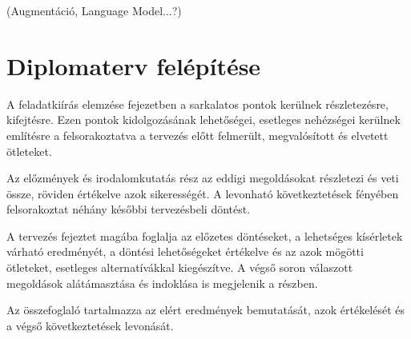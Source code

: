 (Augmentáció, Language Model...?)

\section{Diplomaterv felépítése}

A feladatkiírás elemzése fejezetben a sarkalatos pontok kerülnek részletezésre, kifejtésre. Ezen pontok kidolgozásának lehetőségei, esetleges nehézségei kerülnek említésre a felsorakoztatva a tervezés előtt felmerült, megvalósított és elvetett ötleteket.

Az előzmények és irodalomkutatás rész az eddigi megoldásokat részletezi és veti össze, röviden értékelve azok sikerességét. A levonható következtetések fényében felsorakoztat néhány későbbi tervezésbeli döntést.

A tervezés fejeztet magába foglalja az előzetes döntéseket, a lehetséges kísérletek várható eredményét, a döntési lehetőségeket értékelve és az azok mögötti ötleteket, esetleges alternatívákkal kiegészítve. A végső soron válaszott megoldások alátámasztása és indoklása is megjelenik a részben.

Az összefoglaló tartalmazza az elért eredmények bemutatását, azok értékelését és a végső következtetések levonását.
